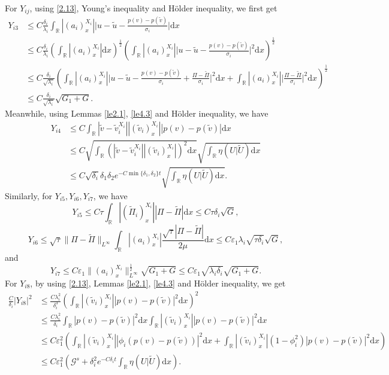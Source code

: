 \documentclass[10pt,reqno]{amsart}
\numberwithin{equation}{section}
\newcommand{\dif}{\mathrm{d}}
\begin{document}
For $Y_{ij}$, using \eqref{2.13}, Young's inequality and H\"{o}lder inequality, we first get
\[
\begin{aligned}
Y_{i3}&\le C\frac{\delta_i}{\lambda_i}\int_\mathbb{R}|(a_i)^{X_i}_x|
\Big|u-\widetilde{u}-\frac{p(v)-p(\widetilde{v})}{\sigma_i}\Big|\dif x\\
&\le C\frac{\delta_i}{\lambda_i}\left(\int_\mathbb{R}|(a_i)^{X_i}_x|
\dif x\right)^{\frac{1}{2}}\left(\int_\mathbb{R}|(a_i)^{X_i}_x|
\Big|u-\widetilde{u}-\frac{p(v)-p(\widetilde{v})}{\sigma_i}\Big|^2\dif x\right)^{\frac{1}{2}}\\
&\le C\frac{\delta_i}{\sqrt{\lambda_i}}\left(\int_\mathbb{R}|(a_i)^{X_i}_x|
\Big|u-\widetilde{u}-\frac{p(v)-p(\widetilde{v})}{\sigma_i}+\frac{\Pi-\widetilde{\Pi}}{\sigma_i}\Big|^2\dif x+
\int_\mathbb{R}|(a_i)^{X_i}_x|
\Big|\frac{\Pi-\widetilde{\Pi}}{\sigma_i}\Big|^2\dif x\right)^{\frac{1}{2}}\\
&\le C\frac{\delta_i}{\sqrt{\lambda_i}}\sqrt{G_1+G}.
\end{aligned}
\]
Meanwhile, using Lemmas \ref{le2.1}, \ref{le4.3} and H\"{o}lder inequality, we have
\begin{align*}
Y_{i4}&\le C\int_\mathbb{R}|\widetilde{v}-\widetilde{v}_i^{X_i}||(\widetilde{v}_i)^{X_i}_x|
|p(v)-p(\widetilde{v})|\dif x\\
&\le C\sqrt{\int_\mathbb{R}(|\widetilde{v}-\widetilde{v}_i^{X_i}||(\widetilde{v}_i)^{X_i}_x|)^2
\dif x}\sqrt{\int_\mathbb{R}\eta(U|\widetilde U)\dif x}\\
&\le C\sqrt{\delta_i}\delta_1\delta_2e^{-C\min\{\delta_1, \delta_2\}t}\sqrt{\int_\mathbb{R}\eta(U|\widetilde U)\dif x}.
\end{align*}
Similarly, for $Y_{i5},Y_{i6},Y_{i7}$, we have
\[
Y_{i5}\le C\tau\int_\mathbb{R}|(\widetilde{\Pi}_i)^{X_i}_x||\Pi-\widetilde{\Pi}|\dif x
\le C\tau\delta_i \sqrt{G},
\]
\[
Y_{i6}\le\sqrt{\tau}\|\Pi-\widetilde{\Pi}\|_{L^\infty}
\int_\mathbb{R}|(a_i)_x^{X_i}|\frac{\sqrt{\tau}|\Pi-\widetilde{\Pi}|}{2\mu}\dif x
\le C\varepsilon_1\lambda_i\sqrt{\tau\delta_i}\sqrt{G},
\]
and
\[
Y_{i7}\le C\varepsilon_1\|(a_i)_x^{X_i}\|_{L^\infty}^{\frac{1}{2}}\sqrt{G_1+G}
\le C\varepsilon_1\sqrt{\lambda_i\delta_i}\sqrt{G_1+G}.
\]
For $Y_{i8}$, by using \eqref{2.13}, Lemmas \ref{le2.1}, \ref{le4.3} and H\"{o}lder inequality, we get
\begin{align*}
\frac{C}{\delta_i}|Y_{i8}|^2
&\le\frac{C\lambda_i^2}{\delta_i^3}
\left(\int_\mathbb{R}|(\widetilde{v}_i)_x^{X_i}||p(v)-p(\widetilde{v})|^2\dif x\right)^2 \\
&\le\frac{C\lambda_i^2}{\delta_i}
\int_\mathbb{R}|p(v)-p(\widetilde{v})|^2\dif x
\int_\mathbb{R}|(\widetilde{v}_i)_x^{X_i}||p(v)-p(\widetilde{v})|^2\dif x\\
&\le C\varepsilon_1^2 \left(\int_\mathbb{R}|(\widetilde{v}_i)_x^{X_i}||\phi_i(p(v)-p(\widetilde{v}))|^2\dif x+\int_\mathbb{R}|(\widetilde{v}_i)_x^{X_i}|(1-\phi_i^2)|p(v)-p(\widetilde{v})|^2\dif x\right)\\
&\le C\varepsilon_1^2\left(\mathcal{G}^s+\delta_i^2e^{-C\delta_it}\int_\mathbb{R}\eta(U|\widetilde U)\dif x\right).
\end{align*}
\end{document}
